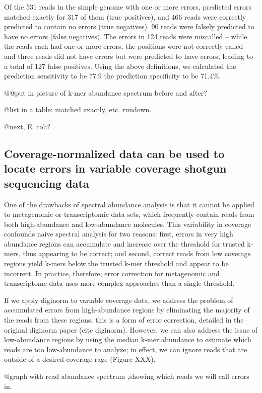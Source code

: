 Of the 531 reads in the simple genome with one or more errors,
predicted errors matched exactly for 317 of them (true positives), and
466 reads were correctly predicted to contain no errors (true
negatives). 90 reads were falsely predicted to have no errors (false
negatives). The errors in 124 reads were miscalled -- while the reads
each had one or more errors, the positions were not correctly called
-- and three reads did not have errors but were predicted to have
errors, leading to a total of 127 false positives.  Using the above
definitions, we calculated the prediction sensitivity to be 77.9%
the prediction specificity to be 71.4\%.

@@put in picture of k-mer abundance spectrum before and after?

@list in a table: matched exactly, etc. rundown.

@next, E. coli?

\subsection{Coverage-normalized data can be used to locate errors in variable
coverage shotgun sequencing data}

One of the drawbacks of spectral abundance analysis is that it cannot
be applied to metagenomic or transcriptomic data sets, which
frequently contain reads from both high-abundance and low-abundance
molecules.  This variability in coverage confounds naive spectral
analysis for two reasons: first, errors in very high abundance regions
can accumulate and increase over the threshold for trusted k-mers,
thus appearing to be correct; and second, correct reads from low
coverage regions yield k-mers below the trusted k-mer threshold and
appear to be incorrect.  In practice, therefore, error correction for
metagenomic and transcriptome data uses more complex approaches than a
single threshold.

If we apply diginorm to variable coverage data, we address the problem
of accumulated errors from high-abundance regions by eliminating the
majority of the reads from these regions; this is a form of error
correction, detailed in the original diginorm paper (cite diginorm).
However, we can also address the issue of low-abundance regions by
using the median k-mer abundance to estimate which reads are too
low-abundance to analyze; in effect, we can ignore reads that are
outside of a desired coverage rage (Figure XXX).

@graph with read abundance spectrum ,showing which reads we will
call errors in.

